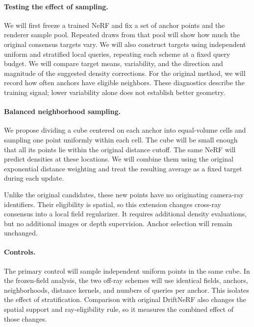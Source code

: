 \documentclass[sigconf,nonacm]{acmart}
\begin{document}
\paragraph{Testing the effect of sampling.}
We will first freeze a trained NeRF and fix a set of anchor points and the renderer sample pool. Repeated draws from that pool will show how much the original consensus targets vary. We will also construct targets using independent uniform and stratified local queries, repeating each scheme at a fixed query budget. We will compare target means, variability, and the direction and magnitude of the suggested density corrections. For the original method, we will record how often anchors have eligible neighbors. These diagnostics describe the training signal; lower variability alone does not establish better geometry.

\paragraph{Balanced neighborhood sampling.}
We propose dividing a cube centered on each anchor into equal-volume cells and sampling one point uniformly within each cell. The cube will be small enough that all its points lie within the original distance cutoff. The same NeRF will predict densities at these locations. We will combine them using the original exponential distance weighting and treat the resulting average as a fixed target during each update.

Unlike the original candidates, these new points have no originating camera-ray identifiers. Their eligibility is spatial, so this extension changes cross-ray consensus into a local field regularizer. It requires additional density evaluations, but no additional images or depth supervision. Anchor selection will remain unchanged.

\paragraph{Controls.}
The primary control will sample independent uniform points in the same cube. In the frozen-field analysis, the two off-ray schemes will use identical fields, anchors, neighborhoods, distance kernels, and numbers of queries per anchor. This isolates the effect of stratification. Comparison with original DriftNeRF also changes the spatial support and ray-eligibility rule, so it measures the combined effect of those changes.
\end{document}
